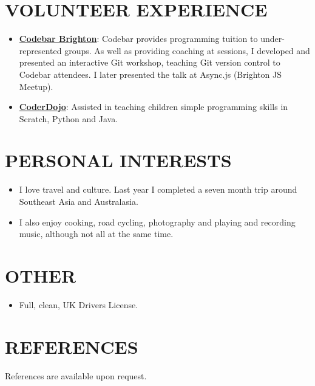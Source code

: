 \documentclass{article}
\begin{document}
 \section*{VOLUNTEER EXPERIENCE}
  \vspace{1em}
  \begin{itemize}
    \item \href{https://codebar.io/brighton}{\textbf{Codebar Brighton}}: Codebar provides programming tuition to under-represented groups. As well as providing coaching at sessions, I developed and presented an interactive Git workshop, teaching Git version control to Codebar attendees. I later presented the talk at Async.js (Brighton JS Meetup).
    \item \href{https://www.coderdojobrighton.co.uk}{\textbf{CoderDojo}}: Assisted in teaching children simple programming skills in Scratch, Python and Java.
  \end{itemize}
  \vspace{1em}

 \section*{PERSONAL INTERESTS}
  \vspace{1em}
  \begin{itemize}
    \item I love travel and culture. Last year I completed a seven month trip around Southeast Asia and Australasia.
    \item I also enjoy cooking, road cycling, photography and playing and recording music, although not all at the same time.
  \end{itemize}
  \vspace{1em}

 \section*{OTHER}
  \vspace{1em}
  \begin{itemize}
    \item Full, clean, UK Drivers License.
  \end{itemize}
  \vspace{1em}

  \section*{REFERENCES}
    \vspace{1em}
    References are available upon request.
\end{document}
